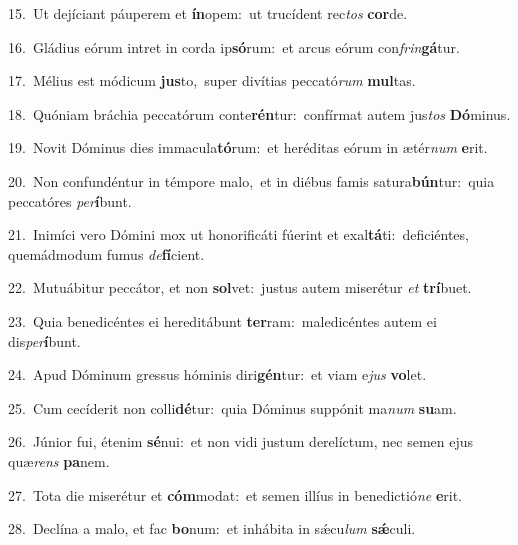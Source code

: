 {\numbfont\textcolor{\numbcolor}{15.}}~Ut dejíciant páuperem et \textbf{ín}\-opem:~\star ut trucídent rec\textit{tos} \textbf{cor}\-de.\par
{\numbfont\textcolor{\numbcolor}{16.}}~Gládius eórum intret in corda ip\-\textbf{só}\-rum:~\star et arcus eórum con\-\textit{frin}\-\textbf{gá}tur.\par
{\numbfont\textcolor{\numbcolor}{17.}}~Mélius est módicum \textbf{jus}\-to,~\star super divítias peccató\textit{rum} \textbf{mul}\-tas.\par
{\numbfont\textcolor{\numbcolor}{18.}}~Quóniam bráchia peccatórum conte\-\textbf{rén}\-tur:~\star confírmat autem jus\textit{tos} \textbf{Dó}\-minus.\par
{\numbfont\textcolor{\numbcolor}{19.}}~Novit Dóminus dies immacula\-\textbf{tó}\-rum:~\star et heréditas eórum in ætér\textit{num} \textbf{e}\-rit.\par
{\numbfont\textcolor{\numbcolor}{20.}}~Non confundéntur in témpore malo,~\dagger et in diébus famis satura\-\textbf{bún}\-tur:~\star quia peccatóres \textit{per}\-\textbf{í}bunt.\par
{\numbfont\textcolor{\numbcolor}{21.}}~Inimíci vero Dómini mox ut honorificáti fúerint et exal\-\textbf{tá}\-ti:~\star deficiéntes, quemádmodum fumus \textit{de}\-\textbf{fí}cient.\par
{\numbfont\textcolor{\numbcolor}{22.}}~Mutuábitur peccátor, et non \textbf{sol}\-vet:~\star justus autem miserétur \textit{et} \textbf{trí}\-buet.\par
{\numbfont\textcolor{\numbcolor}{23.}}~Quia benedicéntes ei hereditábunt \textbf{ter}\-ram:~\star maledicéntes autem ei dis\-\textit{per}\-\textbf{í}bunt.\par
{\numbfont\textcolor{\numbcolor}{24.}}~Apud Dóminum gressus hóminis diri\-\textbf{gén}\-tur:~\star et viam e\textit{jus} \textbf{vo}\-let.\par
{\numbfont\textcolor{\numbcolor}{25.}}~Cum cecíderit non colli\-\textbf{dé}\-tur:~\star quia Dóminus suppónit ma\textit{num} \textbf{su}\-am.\par
{\numbfont\textcolor{\numbcolor}{26.}}~Júnior fui, étenim \textbf{sé}\-nui:~\star et non vidi justum derelíctum, nec semen ejus quæ\textit{rens} \textbf{pa}\-nem.\par
{\numbfont\textcolor{\numbcolor}{27.}}~Tota die miserétur et \textbf{cóm}\-modat:~\star et semen illíus in benedictió\textit{ne} \textbf{e}\-rit.\par
{\numbfont\textcolor{\numbcolor}{28.}}~Declína a malo, et fac \textbf{bo}\-num:~\star et inhábita in sǽcu\textit{lum} \textbf{sǽ}\-culi.\par
